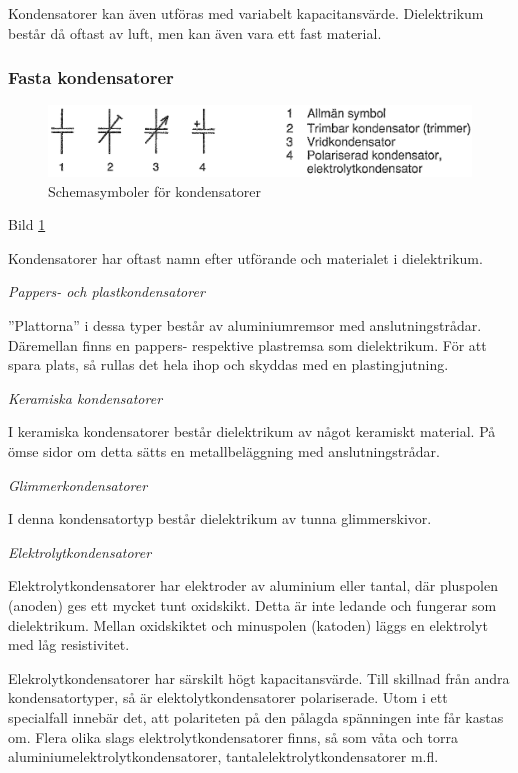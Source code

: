 Kondensatorer kan även utföras med variabelt kapacitansvärde.
Dielektrikum består då oftast av luft, men kan även vara ett fast material.

\subsubsection{Fasta kondensatorer}

\begin{figure}[ht]
\includegraphics[width=\textwidth]{images/cropped_pdfs/bild_2_2-02.pdf}
\caption{Schemasymboler för kondensatorer}
\label{fig:BildII2-2}
\end{figure}

Bild \ref{fig:BildII2-2}

Kondensatorer har oftast namn efter utförande och materialet i dielektrikum.

\emph{Pappers- och plastkondensatorer}

''Plattorna'' i dessa typer består av aluminiumremsor med anslutningstrådar.
Däremellan finns en pappers- respektive plastremsa som dielektrikum. För att
spara plats, så rullas det hela ihop och skyddas med en plastingjutning.

\emph{Keramiska kondensatorer}

I keramiska kondensatorer består dielektrikum av något keramiskt material.
På ömse sidor om detta sätts en metallbeläggning med anslutningstrådar.

\emph{Glimmerkondensatorer}

I denna kondensatortyp består dielektrikum av tunna glimmerskivor.

\emph{Elektrolytkondensatorer}

Elektrolytkondensatorer har elektroder av aluminium eller tantal, där pluspolen
(anoden) ges ett mycket tunt oxidskikt. Detta är inte ledande och fungerar som
dielektrikum. Mellan oxidskiktet och minuspolen (katoden) läggs en elektrolyt
med låg resistivitet.

Elekrolytkondensatorer har särskilt högt kapacitansvärde. Till skillnad från
andra kondensatortyper, så är elektolytkondensatorer polariserade. Utom i ett
specialfall innebär det, att polariteten på den pålagda spänningen inte får
kastas om. Flera olika slags elektrolytkondensatorer finns, så som våta
och torra aluminiumelektrolytkondensatorer, tantalelektrolytkondensatorer m.fl.

